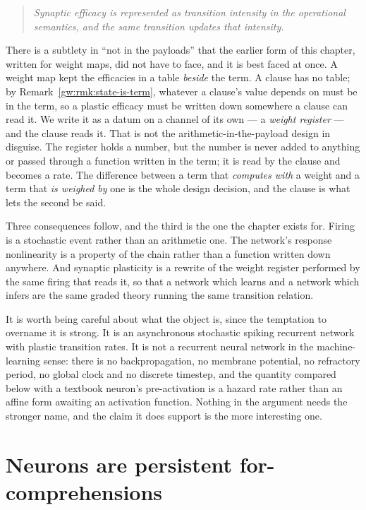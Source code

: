 \begin{quote}
\emph{Synaptic efficacy is represented as transition intensity in the operational
semantics, and the same transition updates that intensity.}
\end{quote}

There is a subtlety in ``not in the payloads'' that the earlier form of this chapter,
written for weight maps, did not have to face, and it is best faced at once. A weight
map kept the efficacies in a table \emph{beside} the term. A clause has no table; by
Remark~\ref{gw:rmk:state-is-term}, whatever a clause's value depends on must be in the
term, so a plastic efficacy must be written down somewhere a clause can read it. We write
it as a datum on a channel of its own --- a \emph{weight register} --- and the clause
reads it. That is not the arithmetic-in-the-payload design in disguise. The register
holds a number, but the number is never added to anything or passed through a function
written in the term; it is read by the clause and becomes a rate. The difference between
a term that \emph{computes with} a weight and a term that \emph{is weighed by} one is the
whole design decision, and the clause is what lets the second be said.

Three consequences follow, and the third is the one the chapter exists for. Firing is a
stochastic event rather than an arithmetic one. The network's response nonlinearity is a
property of the chain rather than a function written down anywhere. And synaptic
plasticity is a rewrite of the weight register performed by the same firing that reads
it, so that a network which learns and a network which infers are the same graded theory
running the same transition relation.

It is worth being careful about what the object is, since the temptation to overname it
is strong. It is an asynchronous stochastic spiking recurrent network with plastic
transition rates. It is not a recurrent neural network in the machine-learning sense:
there is no backpropagation, no membrane potential, no refractory period, no global clock
and no discrete timestep, and the quantity compared below with a textbook neuron's
pre-activation is a hazard rate rather than an affine form awaiting an activation
function. Nothing in the argument needs the stronger name, and the claim it does support
is the more interesting one.

\section{Neurons are persistent for-comprehensions}

